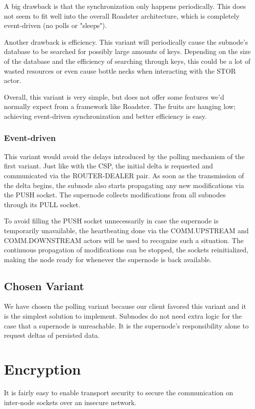 A big drawback is that the synchronization only happens periodically. This
does not seem to fit well into the overall Roadster architecture, which is
completely event-driven (no polls or "sleeps").

Another drawback is efficiency. This variant will periodically cause the
subnode's database to be searched for possibly large amounts of keys. Depending on the size of the
database and the efficiency of searching through keys, this could be a lot of
wasted resources or even cause bottle necks when interacting with the STOR
actor.

Overall, this variant is very simple, but does not offer some features we'd
normally expect from a framework like Roadster. The fruits are hanging low;
achieving event-driven synchronization and better efficiency is easy.

\subsubsection{Event-driven}
This variant would avoid the delays introduced by the polling mechanism of the first
variant. Just like with the \gls{CSP}, the initial delta is requested and
communicated via the ROUTER-DEALER pair. As soon as the transmission of the
delta begins, the subnode also starts propagating any new modifications via the
PUSH socket. The supernode collects modifications from all subnodes through its
PULL socket.

To avoid filling the PUSH socket unnecessarily in case the supernode is
temporarily unavailable, the heartbeating done via the COMM.UPSTREAM and COMM.DOWNSTREAM actors will
be used to recognize such a situation. The continuous propagation of
modifications can be stopped, the sockets reinitialized, making the node ready
for whenever the supernode is back available.

\subsection{Chosen Variant}
We have chosen the polling variant because our client favored this variant and
it is the simplest solution to implement.  Subnodes do not need extra logic for
the case that a supernode is unreachable.  It is the supernode's responsibility
alone to request deltas of persisted data.


\clearpage
\section{Encryption}\label{sec:approach:encryption}
It is fairly easy to enable transport security to secure the communication
on inter-node \zmq sockets over an insecure network.

